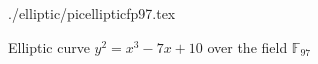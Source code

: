 \begin{figure}
\centering
 {./elliptic/picellipticfp97.tex}
\caption{Elliptic curve $y^2 = x^3 -7 x + 10$ over the field
  $\mathbb{F}_{97}$}
\label{fig:add:ellipticFp97}
\end{figure}
